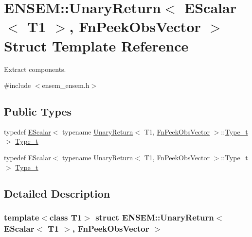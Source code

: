 \hypertarget{structENSEM_1_1UnaryReturn_3_01EScalar_3_01T1_01_4_00_01FnPeekObsVector_01_4}{}\section{E\+N\+S\+EM\+:\+:Unary\+Return$<$ E\+Scalar$<$ T1 $>$, Fn\+Peek\+Obs\+Vector $>$ Struct Template Reference}
\label{structENSEM_1_1UnaryReturn_3_01EScalar_3_01T1_01_4_00_01FnPeekObsVector_01_4}


Extract components.  




{\ttfamily \#include $<$ensem\+\_\+ensem.\+h$>$}

\subsection*{Public Types}
\begin{DoxyCompactItemize}
\item 
typedef \mbox{\hyperlink{classENSEM_1_1EScalar}{E\+Scalar}}$<$ typename \mbox{\hyperlink{structENSEM_1_1UnaryReturn}{Unary\+Return}}$<$ T1, \mbox{\hyperlink{structENSEM_1_1FnPeekObsVector}{Fn\+Peek\+Obs\+Vector}} $>$\+::\mbox{\hyperlink{structENSEM_1_1UnaryReturn_3_01EScalar_3_01T1_01_4_00_01FnPeekObsVector_01_4_ab344f63bc162dc2012f97d027b589de9}{Type\+\_\+t}} $>$ \mbox{\hyperlink{structENSEM_1_1UnaryReturn_3_01EScalar_3_01T1_01_4_00_01FnPeekObsVector_01_4_ab344f63bc162dc2012f97d027b589de9}{Type\+\_\+t}}
\item 
typedef \mbox{\hyperlink{classENSEM_1_1EScalar}{E\+Scalar}}$<$ typename \mbox{\hyperlink{structENSEM_1_1UnaryReturn}{Unary\+Return}}$<$ T1, \mbox{\hyperlink{structENSEM_1_1FnPeekObsVector}{Fn\+Peek\+Obs\+Vector}} $>$\+::\mbox{\hyperlink{structENSEM_1_1UnaryReturn_3_01EScalar_3_01T1_01_4_00_01FnPeekObsVector_01_4_ab344f63bc162dc2012f97d027b589de9}{Type\+\_\+t}} $>$ \mbox{\hyperlink{structENSEM_1_1UnaryReturn_3_01EScalar_3_01T1_01_4_00_01FnPeekObsVector_01_4_ab344f63bc162dc2012f97d027b589de9}{Type\+\_\+t}}
\end{DoxyCompactItemize}


\subsection{Detailed Description}
\subsubsection*{template$<$class T1$>$\newline
struct E\+N\+S\+E\+M\+::\+Unary\+Return$<$ E\+Scalar$<$ T1 $>$, Fn\+Peek\+Obs\+Vector $>$}

